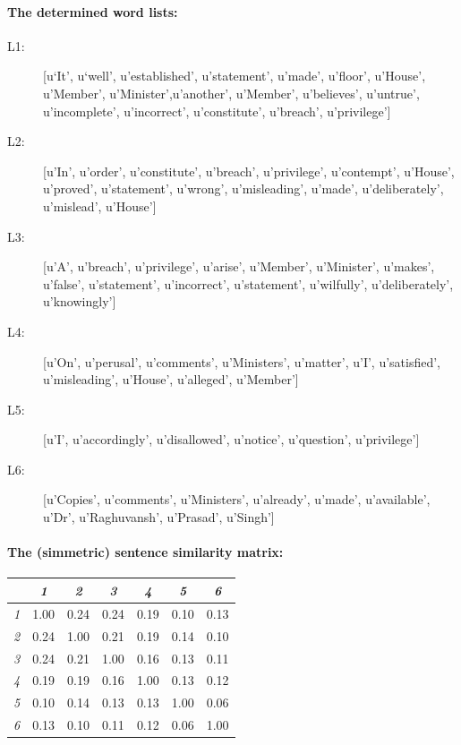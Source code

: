 \documentclass[lnbip]{svmultln}
\begin{document}
\paragraph*{The determined word lists:}
\begin{description}
\item[L1:][u`It', u`well', u'established', u'statement', u'made', u'floor', u'House', u'Member', u'Minister',u'another', u'Member', u'believes', u'untrue', u'incomplete', u'incorrect', u'constitute', u'breach', u'privilege']
\item[L2:] [u'In', u'order', u'constitute', u'breach', u'privilege', u'contempt', u'House', u'proved', u'statement', u'wrong', u'misleading', u'made', u'deliberately', u'mislead', u'House']
\item[L3:] [u'A', u'breach', u'privilege', u'arise', u'Member', u'Minister', u'makes', u'false', u'statement', u'incorrect', u'statement', u'wilfully', u'deliberately', u'knowingly']
\item[L4:] [u'On', u'perusal', u'comments', u'Ministers', u'matter', u'I', u'satisfied', u'misleading', u'House', u'alleged', u'Member']
\item[L5:] [u'I', u'accordingly', u'disallowed', u'notice', u'question', u'privilege']
\item[L6:] [u'Copies', u'comments', u'Ministers', u'already', u'made', u'available', u'Dr', u'Raghuvansh', u'Prasad', u'Singh']
\end{description}
\paragraph*{The (simmetric) sentence similarity matrix:}
\begin{center}
  \begin{tabular}{ | l | c | c | c | c | c | c | }
    \hline
	& \emph{1} & \emph{2} & \emph{3} & \emph{4} & \emph{5} & \emph{6} \\ \hline
    \emph{1} & 1.00 & 0.24 & 0.24 & 0.19 & 0.10 & 0.13  \\ \hline
	\emph{2} & 0.24 & 1.00 & 0.21 & 0.19 & 0.14 & 0.10  \\ \hline
	\emph{3} & 0.24 & 0.21 & 1.00 & 0.16 & 0.13 & 0.11  \\ \hline
	\emph{4} & 0.19 & 0.19 & 0.16 & 1.00 & 0.13 & 0.12  \\ \hline
	\emph{5} & 0.10 & 0.14 & 0.13 & 0.13 & 1.00 & 0.06  \\ \hline
	\emph{6} & 0.13 & 0.10 & 0.11 & 0.12 & 0.06 & 1.00  \\ \hline
  \end{tabular}
\end{center}
\end{document}
